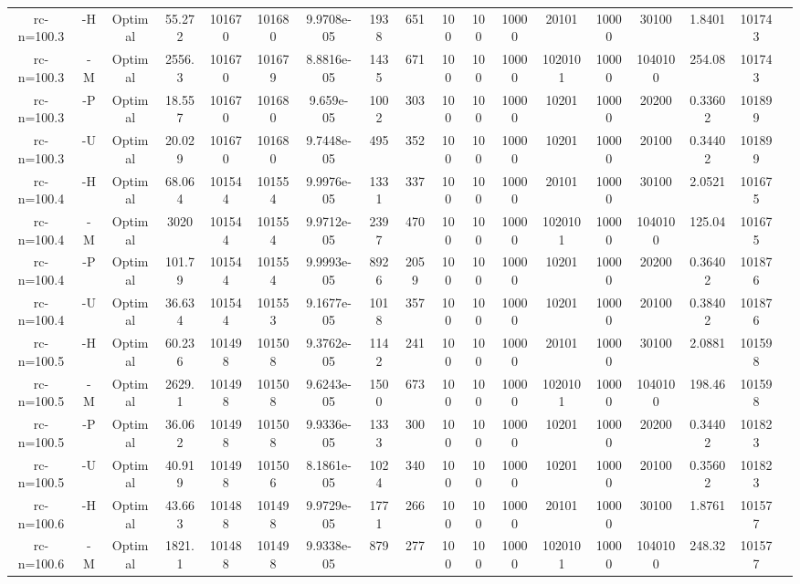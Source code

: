 \documentclass[landscape, a4paper]{article}
\begin{document}
\begin{center}
\begin{tabular}{@{}cccccccccccccccccc@{}}
rc-n=100.3 & -H & Optimal & 55.272 & 101670 & 101680 & 9.9708e-05 & 1938 & 651 & 100 & 100 & 10000 & 20101 & 10000 & 30100 & 1.8401 & 101743 & \\
rc-n=100.3 & -M & Optimal & 2556.3 & 101670 & 101679 & 8.8816e-05 & 1435 & 671 & 100 & 100 & 10000 & 1020101 & 10000 & 1040100 & 254.08 & 101743 & \\
rc-n=100.3 & -P & Optimal & 18.557 & 101670 & 101680 & 9.659e-05 & 1002 & 303 & 100 & 100 & 10000 & 10201 & 10000 & 20200 & 0.33602 & 101899 & \\
rc-n=100.3 & -U & Optimal & 20.029 & 101670 & 101680 & 9.7448e-05 & 495 & 352 & 100 & 100 & 10000 & 10201 & 10000 & 20100 & 0.34402 & 101899 & \\
rc-n=100.4 & -H & Optimal & 68.064 & 101544 & 101554 & 9.9976e-05 & 1331 & 337 & 100 & 100 & 10000 & 20101 & 10000 & 30100 & 2.0521 & 101675 & \\
rc-n=100.4 & -M & Optimal & 3020 & 101544 & 101554 & 9.9712e-05 & 2397 & 470 & 100 & 100 & 10000 & 1020101 & 10000 & 1040100 & 125.04 & 101675 & \\
rc-n=100.4 & -P & Optimal & 101.79 & 101544 & 101554 & 9.9993e-05 & 8926 & 2059 & 100 & 100 & 10000 & 10201 & 10000 & 20200 & 0.36402 & 101876 & \\
rc-n=100.4 & -U & Optimal & 36.634 & 101544 & 101553 & 9.1677e-05 & 1018 & 357 & 100 & 100 & 10000 & 10201 & 10000 & 20100 & 0.38402 & 101876 & \\
rc-n=100.5 & -H & Optimal & 60.236 & 101498 & 101508 & 9.3762e-05 & 1142 & 241 & 100 & 100 & 10000 & 20101 & 10000 & 30100 & 2.0881 & 101598 & \\
rc-n=100.5 & -M & Optimal & 2629.1 & 101498 & 101508 & 9.6243e-05 & 1500 & 673 & 100 & 100 & 10000 & 1020101 & 10000 & 1040100 & 198.46 & 101598 & \\
rc-n=100.5 & -P & Optimal & 36.062 & 101498 & 101508 & 9.9336e-05 & 1333 & 300 & 100 & 100 & 10000 & 10201 & 10000 & 20200 & 0.34402 & 101823 & \\
rc-n=100.5 & -U & Optimal & 40.919 & 101498 & 101506 & 8.1861e-05 & 1024 & 340 & 100 & 100 & 10000 & 10201 & 10000 & 20100 & 0.35602 & 101823 & \\
rc-n=100.6 & -H & Optimal & 43.663 & 101488 & 101498 & 9.9729e-05 & 1771 & 266 & 100 & 100 & 10000 & 20101 & 10000 & 30100 & 1.8761 & 101577 & \\
rc-n=100.6 & -M & Optimal & 1821.1 & 101488 & 101498 & 9.9338e-05 & 879 & 277 & 100 & 100 & 10000 & 1020101 & 10000 & 1040100 & 248.32 & 101577 & \\

\end{tabular}
\end{center}
\end{document}
